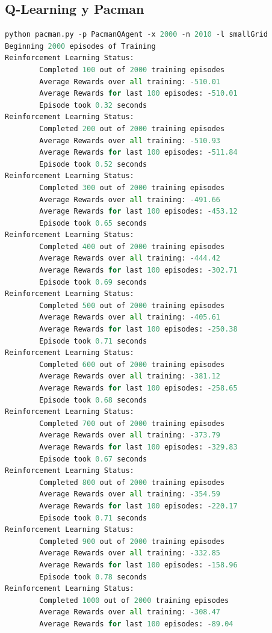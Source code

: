 \documentclass{report}
\begin{document}
      \subsection{Q-Learning y Pacman} %
\begin{lstlisting}[language=Python, caption=Ejecución de Q-Learning y Pacman 1]
python pacman.py -p PacmanQAgent -x 2000 -n 2010 -l smallGrid
Beginning 2000 episodes of Training
Reinforcement Learning Status:
        Completed 100 out of 2000 training episodes
        Average Rewards over all training: -510.01
        Average Rewards for last 100 episodes: -510.01
        Episode took 0.32 seconds
Reinforcement Learning Status:
        Completed 200 out of 2000 training episodes
        Average Rewards over all training: -510.93
        Average Rewards for last 100 episodes: -511.84
        Episode took 0.52 seconds
Reinforcement Learning Status:
        Completed 300 out of 2000 training episodes
        Average Rewards over all training: -491.66
        Average Rewards for last 100 episodes: -453.12
        Episode took 0.65 seconds
Reinforcement Learning Status:
        Completed 400 out of 2000 training episodes
        Average Rewards over all training: -444.42
        Average Rewards for last 100 episodes: -302.71
        Episode took 0.69 seconds
Reinforcement Learning Status:
        Completed 500 out of 2000 training episodes
        Average Rewards over all training: -405.61
        Average Rewards for last 100 episodes: -250.38
        Episode took 0.71 seconds
Reinforcement Learning Status:
        Completed 600 out of 2000 training episodes
        Average Rewards over all training: -381.12
        Average Rewards for last 100 episodes: -258.65
        Episode took 0.68 seconds
Reinforcement Learning Status:
        Completed 700 out of 2000 training episodes
        Average Rewards over all training: -373.79
        Average Rewards for last 100 episodes: -329.83
        Episode took 0.67 seconds
Reinforcement Learning Status:
        Completed 800 out of 2000 training episodes
        Average Rewards over all training: -354.59
        Average Rewards for last 100 episodes: -220.17
        Episode took 0.71 seconds
Reinforcement Learning Status:
        Completed 900 out of 2000 training episodes
        Average Rewards over all training: -332.85
        Average Rewards for last 100 episodes: -158.96
        Episode took 0.78 seconds
Reinforcement Learning Status:
        Completed 1000 out of 2000 training episodes
        Average Rewards over all training: -308.47
        Average Rewards for last 100 episodes: -89.04

\end{lstlisting}
\end{document}
